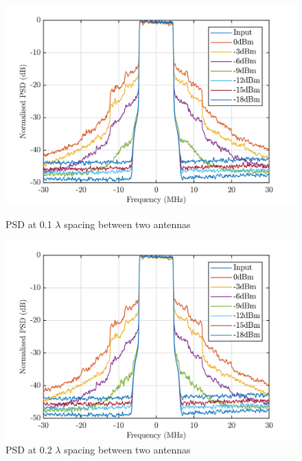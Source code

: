 \begin{figure}[H]
  \centering
  \begin{minipage}[b]{0.5\textwidth}
	\includegraphics[scale = 0.5]{figures/measurement/two_antenna/psd_01.png}
	\caption{PSD at 0.1 $\lambda$ spacing between two antennas}
    \label{fig:psd01}
  \end{minipage}
  \hfill
  \begin{minipage}[b]{0.4\textwidth}
\includegraphics[scale = 0.5]{figures/measurement/two_antenna/psd_02.png}
\caption{PSD at 0.2 $\lambda$ spacing between two antennas}
    \label{fig:psd02}
  \end{minipage}
\end{figure}

